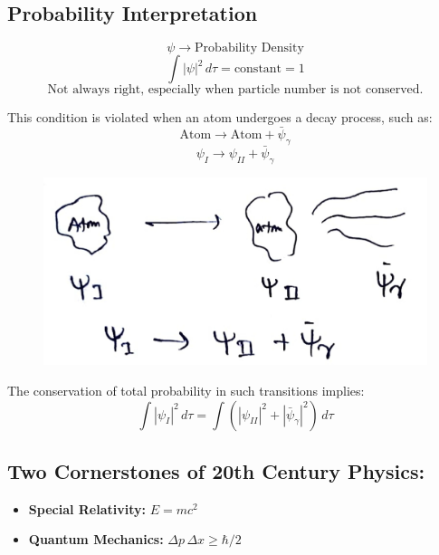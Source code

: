 \documentclass[14pt]{article} %
\begin{document}
\subsection*{Probability Interpretation}
\[
\psi \rightarrow \text{Probability Density}
\]
\[
    \int |\psi|^2 \, d\tau = \text{constant} =1
\]
$$\text{Not always right, especially when particle number is not conserved.}$$

This condition is violated when an atom undergoes a decay process, such as:
\[
\text{Atom} \rightarrow \text{Atom} + \bar{\psi}_{\gamma}
\]
\[
    \psi_I \rightarrow \psi_{II} + \bar{\psi}_\gamma
\]
\begin{figure}[H]
\centering
\includegraphics[width=0.6\linewidth]{L(-2)_3.jpg}
\caption*{}
\end{figure}
The conservation of total probability in such transitions implies:
\[
\int |\psi_I|^2 \, d\tau = \int \left(|\psi_{II}|^2 + |\bar{\psi}_\gamma|^2\right) \, d\tau
\]
\subsection*{Two Cornerstones of 20th Century Physics:}
\begin{itemize}
    \item \textbf{Special Relativity:} $E = mc^2$
    \item \textbf{Quantum Mechanics:} $\Delta p \, \Delta x \geq \hbar/2$
\end{itemize}
\end{document}

